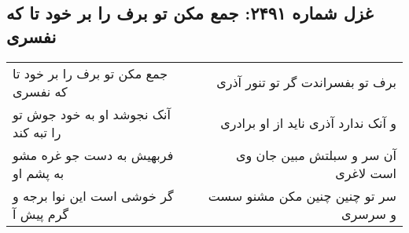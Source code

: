 \begin{center}
\section*{غزل شماره ۲۴۹۱: جمع مکن تو برف را بر خود تا که نفسری}
\label{sec:2491}
\begin{longtable}{l p{0.5cm} r}
جمع مکن تو برف را بر خود تا که نفسری
&&
برف تو بفسراندت گر تو تنور آذری
\\
آنک نجوشد او به خود جوش تو را تبه کند
&&
و آنک ندارد آذری ناید از او برادری
\\
فربهیش به دست جو غره مشو به پشم او
&&
آن سر و سبلتش مبین جان وی است لاغری
\\
گر خوشی است این نوا برجه و گرم پیش آ
&&
سر تو چنین چنین مکن مشنو سست و سرسری
\\
\end{longtable}
\end{center}
